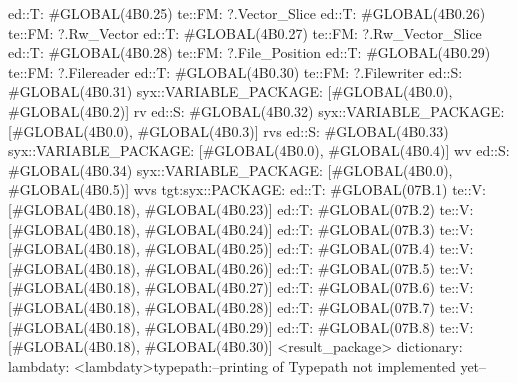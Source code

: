                                 ed::T: #GLOBAL(4B0.25) te::FM: ?.Vector_Slice
                                ed::T: #GLOBAL(4B0.26) te::FM: ?.Rw_Vector
                                ed::T: #GLOBAL(4B0.27) te::FM: ?.Rw_Vector_Slice
                                ed::T: #GLOBAL(4B0.28) te::FM: ?.File_Position
                                ed::T: #GLOBAL(4B0.29) te::FM: ?.Filereader
                                ed::T: #GLOBAL(4B0.30) te::FM: ?.Filewriter
                            ed::S: #GLOBAL(4B0.31)
                             syx::VARIABLE_PACKAGE:
                             [#GLOBAL(4B0.0), #GLOBAL(4B0.2)]
                             rv
                            ed::S: #GLOBAL(4B0.32)
                             syx::VARIABLE_PACKAGE:
                             [#GLOBAL(4B0.0), #GLOBAL(4B0.3)]
                             rvs
                            ed::S: #GLOBAL(4B0.33)
                             syx::VARIABLE_PACKAGE:
                             [#GLOBAL(4B0.0), #GLOBAL(4B0.4)]
                             wv
                            ed::S: #GLOBAL(4B0.34)
                             syx::VARIABLE_PACKAGE:
                             [#GLOBAL(4B0.0), #GLOBAL(4B0.5)]
                             wvs
                        tgt:syx::PACKAGE:
                            ed::T: #GLOBAL(07B.1)
                             te::V:
                             [#GLOBAL(4B0.18), #GLOBAL(4B0.23)]
                            ed::T: #GLOBAL(07B.2)
                             te::V:
                             [#GLOBAL(4B0.18), #GLOBAL(4B0.24)]
                            ed::T: #GLOBAL(07B.3)
                             te::V:
                             [#GLOBAL(4B0.18), #GLOBAL(4B0.25)]
                            ed::T: #GLOBAL(07B.4)
                             te::V:
                             [#GLOBAL(4B0.18), #GLOBAL(4B0.26)]
                            ed::T: #GLOBAL(07B.5)
                             te::V:
                             [#GLOBAL(4B0.18), #GLOBAL(4B0.27)]
                            ed::T: #GLOBAL(07B.6)
                             te::V:
                             [#GLOBAL(4B0.18), #GLOBAL(4B0.28)]
                            ed::T: #GLOBAL(07B.7)
                             te::V:
                             [#GLOBAL(4B0.18), #GLOBAL(4B0.29)]
                            ed::T: #GLOBAL(07B.8)
                             te::V:
                             [#GLOBAL(4B0.18), #GLOBAL(4B0.30)]
         <result_package>
dictionary:
lambdaty:
  <lambdaty>typepath:--printing of Typepath not implemented yet--
